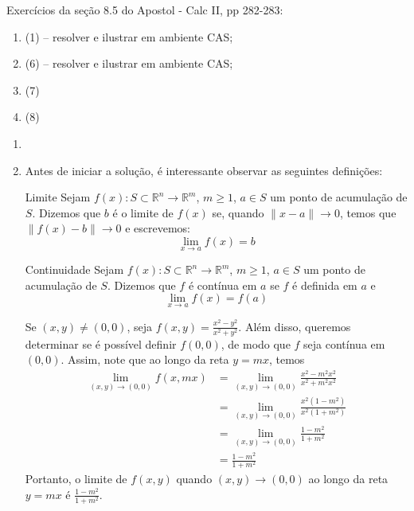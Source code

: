 \documentclass[../main.tex]{subfiles}
\begin{document}
		\begin{exercicio}{4}
			Exercícios da seção 8.5 do Apostol - Calc II, pp 282-283:
			\begin{enumerate}[label=\alph*)]
				\item (1) -- resolver e ilustrar em ambiente CAS;
				\item (6) -- resolver e ilustrar em ambiente CAS;
				\item (7)
				\item (8)
			\end{enumerate}
		\end{exercicio}
		\begin{solucao}
			\begin{enumerate}[label=\alph*)]
				\item 
				\item Antes de iniciar a solução, é interessante observar as seguintes definições:
				\begin{definicao}{Limite}
					Sejam $f(x)\colon S\subset \mathbb{R}^n\to \mathbb{R}^m$, $m\geq 1$, $a\in S$ um ponto de acumulação de $S$. Dizemos que $b$ é o limite de $f(x)$ se, quando $\|x-a\|\to 0$, temos que $\|f(x)-b\|\to 0$ e escrevemos:
					\[
					\lim_{x\to a}f(x)=b
					\]
				\end{definicao}
				\begin{definicao}{Continuidade}
					Sejam $f(x)\colon S\subset \mathbb{R}^n\to \mathbb{R}^m$, $m\geq 1$, $a\in S$ um ponto de acumulação de $S$. Dizemos que $f$ é contínua em $a$ se $f$ é definida em $a$ e
					\[
					\lim_{x\to a}f(x)=f(a)
					\]
				\end{definicao}
				
				Se $(x,y)\neq (0,0)$, seja $f(x,y)=\tfrac{x^2-y^2}{x^2+y^2}$. Além disso, queremos determinar se é possível definir $f(0,0)$, de modo que $f$ seja contínua em $(0,0)$.
				Assim, note que ao longo da reta $y=mx$, temos
				\begin{align*}
					\lim_{(x,y)\to (0,0)} f(x,mx)
					&=\lim_{(x,y)\to (0,0)} \frac{x^2-m^2x^2}{x^2+m^2x^2}\\
					&=\lim_{(x,y)\to (0,0)}\frac{x^2(1-m^2)}{x^2(1+m^2)}\\
					&=\lim_{(x,y)\to (0,0)}\frac{1-m^2}{1+m^2}\\
					&=\frac{1-m^2}{1+m^2}
				\end{align*}
				Portanto, o limite de $f(x,y)$ quando $(x,y)\to (0,0)$ ao longo da reta $y=mx$ é $\tfrac{1-m^2}{1+m^2}$.
				

\end{enumerate}
\end{solucao}
\end{document}
